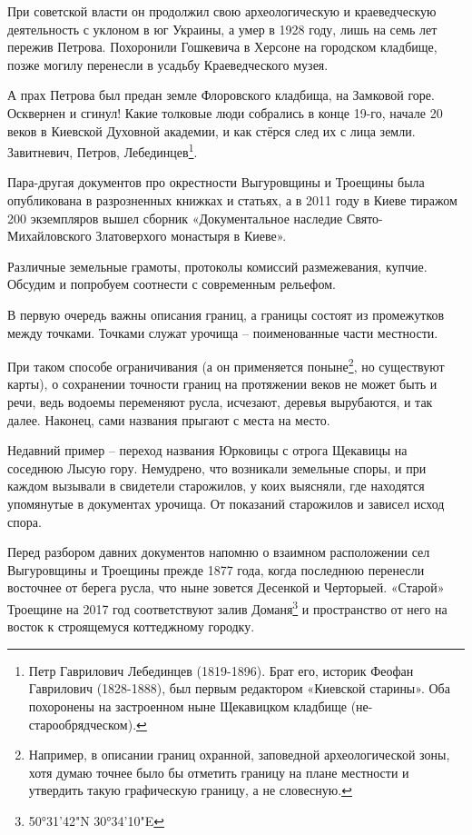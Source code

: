 При советской власти он продолжил свою археологическую и краеведческую деятельность с уклоном в юг Украины, а умер в 1928 году, лишь на семь лет пережив Петрова. Похоронили Гошкевича в Херсоне на городском кладбище, позже могилу перенесли в усадьбу Краеведческого музея.

А прах Петрова был предан земле Флоровского кладбища, на Замковой горе. Осквернен и сгинул! Какие толковые люди собрались в конце 19-го, начале 20 веков в Киевской Духовной академии, и как стёрся след их с лица земли. Завитневич, Петров, Лебединцев\footnote{Петр Гаврилович Лебединцев (1819-1896). Брат его, историк Феофан Гаврилович (1828-1888), был первым редактором «Киевской старины». Оба похоронены на застроенном ныне Щекавицком кладбище (не-старообрядческом).}.

Пара-другая документов про окрестности Выгуровщины и Троещины была опубликована в разрозненных книжках и статьях, а в 2011 году в Киеве тиражом 200 экземпляров вышел сборник «Документальное наследие Свято-Михайловского Златоверхого монастыря в Киеве»\cite{mihdocs}.

Различные земельные грамоты, протоколы комиссий размежевания, купчие. Обсудим и попробуем соотнести с современным рельефом.

В первую очередь важны описания границ, а границы состоят из промежутков между точками. Точками служат урочища – поименованные части местности.

При таком способе ограничивания (а он применяется поныне\footnote{Например, в описании границ охранной, заповедной археологической зоны, хотя думаю точнее было бы отметить границу на плане местности и утвердить такую графическую границу, а не словесную.}, но существуют карты), о сохранении точности границ на протяжении веков не может быть и речи, ведь водоемы переменяют русла, исчезают, деревья вырубаются, и так далее. Наконец, сами названия прыгают с места на место. 

Недавний пример – переход названия Юрковицы с отрога Щекавицы на соседнюю Лысую гору. Немудрено, что возникали земельные споры, и при каждом вызывали в свидетели старожилов, у коих выясняли, где находятся упомянутые в документах урочища. От показаний старожилов и зависел исход спора.

Перед разбором давних документов напомню о взаимном расположении сел Выгуровщины и Троещины прежде 1877 года, когда последнюю перенесли восточнее от берега русла, что ныне зовется Десенкой и Черторыей. «Старой» Троещине на 2017 год соответствуют залив Доманя\footnote{50°31'42"N 30°34'10"E} и пространство от него на восток к строящемуся коттеджному городку.


